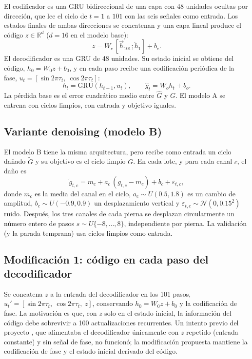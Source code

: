 \documentclass[11pt,a4paper]{article}
\newcommand{\R}{\mathbb{R}}
\begin{document}
El codificador es una GRU \cite{cho2014} bidireccional \cite{schuster1997} de una capa con 48 unidades ocultas por dirección, que lee el ciclo de $t=1$ a $101$ con las seis señales como entrada. Los estados finales de ambas direcciones se concatenan y una capa lineal produce el código $z\in\R^{d}$ ($d=16$ en el modelo base):
\begin{equation}
z = W_e\,[\overrightarrow{h}_{101};\overleftarrow{h}_{1}] + b_e .
\end{equation}
El decodificador es una GRU de 48 unidades. Su estado inicial se obtiene del código, $h_0=W_0 z+b_0$, y en cada paso recibe una codificación periódica de la fase, $u_t=[\sin 2\pi\tau_t,\ \cos 2\pi\tau_t]$:
\begin{equation}
h_t=\mathrm{GRU}(h_{t-1},u_t),\qquad \hat g_t = W_o h_t + b_o .
\end{equation}
La pérdida base es el error cuadrático medio entre $\hat G$ y $G$. El modelo A se entrena con ciclos limpios, con entrada y objetivo iguales.

\subsection{Variante denoising (modelo B)}
\label{sec:denoising}

El modelo B tiene la misma arquitectura, pero recibe como entrada un ciclo dañado $\tilde G$ y su objetivo es el ciclo limpio $G$. En cada lote, y para cada canal $c$, el daño es
\begin{equation}
\tilde g_{t,c}=m_c+a_c\,(g_{t,c}-m_c)+b_c+\varepsilon_{t,c},
\end{equation}
donde $m_c$ es la media del canal en el ciclo, $a_c\sim U(0.5,1.8)$ es un cambio de amplitud, $b_c\sim U(-0.9,0.9)$ un desplazamiento vertical y $\varepsilon_{t,c}\sim\mathcal N(0,0.15^2)$ ruido. Después, los tres canales de cada pierna se desplazan circularmente un número entero de pasos $s\sim U\{-8,\dots,8\}$, independiente por pierna. La validación (y la parada temprana) usa ciclos limpios como entrada.

\subsection{Modificación 1: código en cada paso del decodificador}

Se concatena $z$ a la entrada del decodificador en los 101 pasos, $u_t'=[\sin 2\pi\tau_t,\ \cos 2\pi\tau_t,\ z]$, conservando $h_0=W_0z+b_0$ y la codificación de fase. La motivación es que, con $z$ solo en el estado inicial, la información del código debe sobrevivir a 100 actualizaciones recurrentes. Un intento previo del proyecto \cite{neurostride2026}, que alimentaba el decodificador únicamente con $z$ repetido (entrada constante) y sin señal de fase, no funcionó; la modificación propuesta mantiene la codificación de fase y el estado inicial derivado del código.
\end{document}
